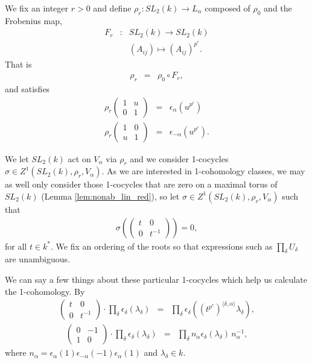 We fix an integer $r > 0$ and define $\rho_r:SL_2(k) \rightarrow L_\alpha$ composed of $\rho_0$ and the Frobenius map,
\begin{eqnarray*}
F_r&:&SL_2(k)\rightarrow SL_2(k) \\
&& (A_{ij}) \mapsto (A_{ij})^{p^r}.
\end{eqnarray*}
That is
\begin{eqnarray*}
\rho_r &=& \rho_0 \circ F_r,
\end{eqnarray*}
and satisfies
\begin{eqnarray*}
\rho_r \left(\begin{matrix} 1 &  u \\ 0 & 1 \end{matrix} \right) &=& \epsilon_\alpha(u^{p^r}) \\
\rho_r \left(\begin{matrix} 1 & 0 \\ u & 1 \end{matrix} \right) &=& \epsilon_{-\alpha}(u^{p^r}).
\end{eqnarray*}

We let $SL_2(k)$ act on $V_\alpha$ via $\rho_r$ and we consider 1-cocycles $\sigma \in Z^1(SL_2(k), \rho_r, V_\alpha)$. As we are interested in 1-cohomology classes, we may as well only consider those 1-cocycles that are zero on a maximal torus of $SL_2(k)$ (Lemma \ref{lem:nonab_lin_red}), so let $\sigma \in Z^1(SL_2(k), \rho_r, V_\alpha)$ such that
\begin{eqnarray*}
\sigma\left(\left(\begin{matrix} t & 0 \\ 0 & t^{-1}\end{matrix}\right)\right) = 0,
\end{eqnarray*}
for all $t\in k^*$.
We fix an ordering of the roots so that expressions such as $\prod_\delta U_\delta$ are unambiguous.

We can say a few things about these particular 1-cocycles which help us calculate the 1-cohomology.  By \cite[Theorem 26.3(c)]{humphreys1975linear}
\begin{eqnarray}
\left(\begin{matrix} t & 0 \\ 0 & t^{-1}\end{matrix}\right) \cdot \prod_\delta \epsilon_\delta (\lambda_\delta) &=&
\prod_\delta \epsilon_\delta\left( (t^{p^r})^{\langle \delta, \alpha\rangle}\lambda_\delta\right),
\label{eqn:t_act}
\end{eqnarray}
\begin{eqnarray}
\left(\begin{matrix} 0 & -1 \\ 1 & 0 \end{matrix}\right) \cdot \prod_\delta \epsilon_\delta (\lambda_\delta) &=&
\prod_\delta n_\alpha \epsilon_\delta\left( \lambda_\delta\right)\, n_\alpha^{-1},
\label{eqn:n_act}
\end{eqnarray}
where $n_\alpha = \epsilon_\alpha(1)\epsilon_{-\alpha}(-1)\epsilon_\alpha(1)$ and $\lambda_\delta \in k$.

